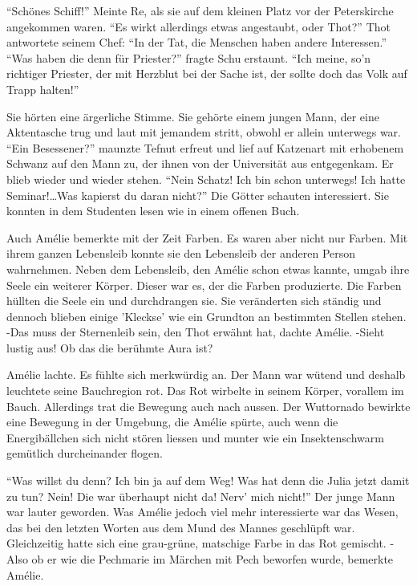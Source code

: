 \documentclass[11pt,titlepage,a5paper]{book}
\begin{document}
"`Schönes Schiff!"' Meinte Re, als sie auf dem kleinen Platz vor der Peterskirche angekommen waren. "`Es wirkt allerdings etwas angestaubt, oder Thot?"' Thot antwortete seinem Chef: "`In der Tat, die Menschen haben andere Interessen."' "`Was haben die denn für Priester?"' fragte Schu erstaunt. "`Ich meine, so'n richtiger Priester, der mit Herzblut bei der Sache ist, der sollte doch das Volk auf Trapp halten!"'

Sie hörten eine ärgerliche Stimme. Sie gehörte einem jungen Mann, der eine Aktentasche trug und laut mit jemandem stritt, obwohl er allein unterwegs war. "`Ein Besessener?"' maunzte Tefnut erfreut und lief auf Katzenart mit erhobenem Schwanz auf den Mann zu, der ihnen von der Universität aus entgegenkam. Er blieb wieder und wieder stehen. "`Nein Schatz! Ich bin schon unterwegs! Ich hatte Seminar!\dots Was kapierst du daran nicht?"' Die Götter schauten interessiert. Sie konnten in dem Studenten lesen wie in einem offenen Buch. 

Auch Amélie bemerkte mit der Zeit Farben. Es waren aber nicht nur Farben. Mit ihrem ganzen Lebensleib konnte sie den Lebensleib der anderen Person wahrnehmen. Neben dem Lebensleib, den Amélie schon etwas kannte, umgab ihre Seele ein weiterer Körper. Dieser war es, der die Farben produzierte. Die Farben hüllten die Seele ein und durchdrangen sie. Sie veränderten sich ständig und dennoch blieben einige 'Kleckse' wie ein Grundton an bestimmten Stellen stehen. -Das muss der Sternenleib sein, den Thot erwähnt hat, dachte Amélie. -Sieht lustig aus! Ob das die berühmte Aura ist?

Amélie lachte. Es fühlte sich merkwürdig an. Der Mann war wütend und deshalb leuchtete seine Bauchregion rot. Das Rot wirbelte in seinem Körper, vorallem im Bauch. Allerdings trat die Bewegung auch nach aussen. Der Wuttornado bewirkte eine Bewegung in der Umgebung, die Amélie spürte, auch wenn die Energibällchen sich nicht stören liessen und munter wie ein Insektenschwarm gemütlich durcheinander flogen.

"`Was willst du denn? Ich bin ja auf dem Weg! Was hat denn die Julia jetzt damit zu tun? Nein! Die war überhaupt nicht da! Nerv' mich nicht!"' Der junge Mann war lauter geworden. Was Amélie jedoch viel mehr interessierte war das Wesen, das bei den letzten Worten aus dem Mund des Mannes geschlüpft war. Gleichzeitig hatte sich eine grau-grüne, matschige Farbe in das Rot gemischt. -Also ob er wie die Pechmarie im Märchen mit Pech beworfen wurde, bemerkte Amélie.
\end{document}
